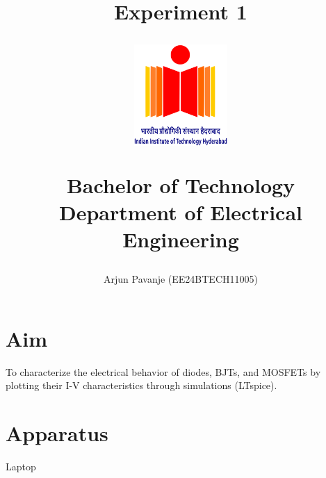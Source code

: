 \documentclass[12pt,a4paper]{report}
\begin{document}
\title{\textbf{Experiment 1}\\
\LARGE{\textbf{ }}
\author{ Arjun Pavanje (EE24BTECH11005)}

\begin{center}
\end{center}
\vspace{30pt}
\begin{figure}[ht]
	\centering
	\includegraphics[width = 100pt]{logo.png}\\
\end{figure}
\begin{center}
	Bachelor of Technology\\
	\vspace{10pt}
	Department of Electrical Engineering\\
\end{center}
}
\maketitle


\section{Aim} To characterize the electrical behavior of diodes, BJTs, and MOSFETs by plotting their I-V characteristics through simulations (LTspice).
\section{Apparatus}
Laptop
\end{document}
